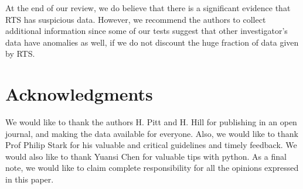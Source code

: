 \documentclass{article}
\begin{document}
At the end of our review, we do believe that there is a significant evidence that RTS has suspicious data.
 However, we recommend the authors to collect additional information since some of our tests suggest that other investigator's data have anomalies as well, if we do not discount the huge fraction of data given by RTS.

\section*{Acknowledgments} %
\label{sec:acknowledgments}

We would like to thank the authors H. Pitt and H. Hill for publishing in an open journal, and making the data available for everyone. Also, we would like to thank Prof Philip Stark for his valuable and critical guidelines and timely feedback. We would also like to thank Yuansi Chen for valuable tips with python. As a final note, we would like to claim complete responsibility for all the opinions expressed in this paper.






    
\end{document}
